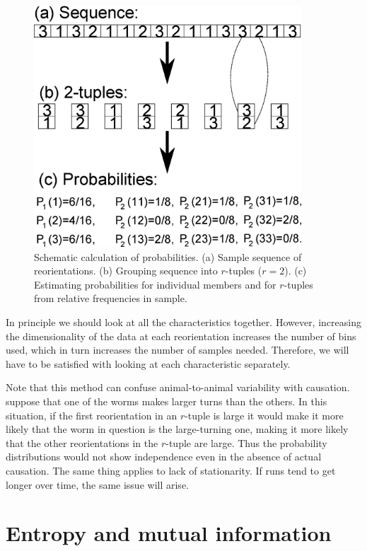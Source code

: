 \documentclass[12pt]{article}
\begin{document}
\begin{figure}
  \begin{center}
    \includegraphics[width=10cm]{schematic.eps}
  \end{center}
  \caption{Schematic calculation of probabilities. (a) Sample sequence of reorientations. (b) Grouping sequence into $r$-tuples ($r=2$). (c) Estimating probabilities for individual members and for $r$-tuples from relative frequencies in sample.} \label{fig:schematic}
\end{figure}

In principle we should look at all the characteristics together. However, increasing the dimensionality of the data at each reorientation increases the number of bins used, which in turn increases the number of samples needed. Therefore, we will have to be satisfied with looking at each characteristic separately.

Note that this method can confuse animal-to-animal variability with causation. \Eg suppose that one of the worms makes larger turns than the others. In this situation, if the first reorientation in an $r$-tuple is large it would make it more likely that the worm in question is the large-turning one, making it more likely that the other reorientations in the $r$-tuple are large. Thus the probability distributions would not show independence even in the absence of actual causation. The same thing applies to lack of stationarity. If runs tend to get longer over time, the same issue will arise.


\section{Entropy and mutual information}\label{sec:entropy}
\end{document}
